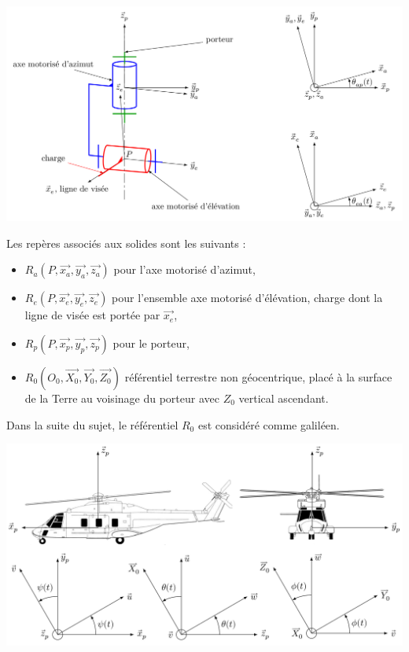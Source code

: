 \begin{center}
\includegraphics[width=0.9\linewidth]{img/fig07}
\end{center}

Les repères associés aux solides sont les suivants :
\begin{itemize}
 \item $R_a(P,\overrightarrow{x_a},\overrightarrow{y_a},\overrightarrow{z_a})$ pour l'axe motorisé d'azimut,
 \item $R_e(P,\overrightarrow{x_e},\overrightarrow{y_e},\overrightarrow{z_e})$ pour l'ensemble {axe motorisé d'élévation, charge} dont la ligne de visée est portée par $\overrightarrow{x_e}$,
 \item $R_p(P,\overrightarrow{x_p},\overrightarrow{y_p},\overrightarrow{z_p})$ pour le porteur,
 \item $R_0(O_0,\overrightarrow{X_0},\overrightarrow{Y_0},\overrightarrow{Z_0})$ référentiel terrestre non géocentrique, placé à la surface de la Terre au voisinage du porteur avec $Z_0$ vertical ascendant.
\end{itemize}

Dans la suite du sujet, le référentiel $R_0$ est considéré comme galiléen.

\begin{center}
\includegraphics[width=0.8\linewidth]{img/fig08}
\end{center}

